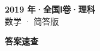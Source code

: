 \documentclass[zihao=-4, a4paper]{ctexart}
\begin{document}
\begin{center}
  {\Large\bfseries 2019 年·全国Ⅰ卷·理科}\\[4pt]
  {\large 数学 · 简答版}
\end{center}
\medskip
{}

\clearpage
{}
\begin{center}{\Large\bfseries 答案速查}\end{center}
\medskip

\end{document}
